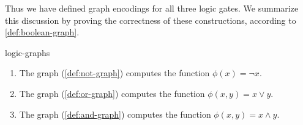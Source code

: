 Thus we have defined graph encodings for all three logic gates.  We summarize
this discussion by proving the correctness of these constructions, according to
\cref{def:boolean-graph}.

\begin{theorem}{}{logic-graphs}

  \begin{enumerate}[nosep]
    \item The \NOT{} graph (\cref{def:not-graph}) computes the function
      \(ϕ(x)=¬x\).
    \item The \OR{} graph (\cref{def:or-graph}) computes the function
      \(ϕ(x,y)=x∨y\).
    \item The \AND{} graph (\cref{def:and-graph}) computes the function
      \(ϕ(x,y)=x∧y\).
  \end{enumerate}

\end{theorem}

